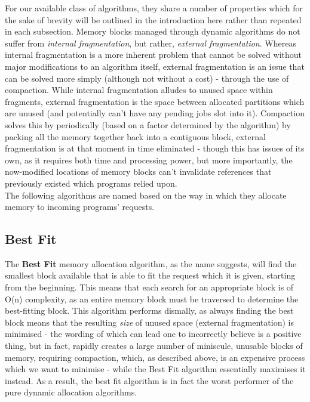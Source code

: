 \documentclass[11pt]{article}
\begin{document}
For our available class of algorithms, they share a number of properties which for the sake of brevity will be outlined in the introduction here rather than repeated in each subsection. Memory blocks managed through dynamic algorithms do not suffer from \textit{internal fragmentation}, but rather, \textit{external fragmentation}. Whereas internal fragmentation is a more inherent problem that cannot be solved without major modifications to an algorithm itself, external fragmentation is an issue that can be solved more simply (although not without a cost) - through the use of compaction. While internal fragmentation alludes to unused space within fragments, external fragmentation is the space between allocated partitions which are unused (and potentially can't have any pending jobs slot into it). Compaction solves this by periodically (based on a factor determined by the algorithm) by packing all the memory together back into a contiguous block, external fragmentation is at that moment in time eliminated - though this has issues of its own, as it requires both time and processing power, but more importantly, the now-modified locations of memory blocks can't invalidate references that previously existed which programs relied upon.\\

The following algorithms are named based on the way in which they allocate memory to incoming programs' requests.

\subsection{Best Fit}
The \textbf{Best Fit} memory allocation algorithm, as the name suggests, will find the smallest block available that is able to fit the request which it is given, starting from the beginning. This means that each search for an appropriate block is of O(n) complexity, as an entire memory block must be traversed to determine the best-fitting block. This algorithm performs dismally, as always finding the best block means that the resulting \textit{size} of unused space (external fragmentation) is minimised - the wording of which can lead one to incorrectly believe is a positive thing, but in fact, rapidly creates a large number of miniscule, unusable blocks of memory, requiring compaction, which, as described above, is an expensive process which we want to minimise - while the Best Fit algorithm essentially maximises it instead. As a result, the best fit algorithm is in fact the worst performer of the pure dynamic allocation algorithms.\\
\end{document}
